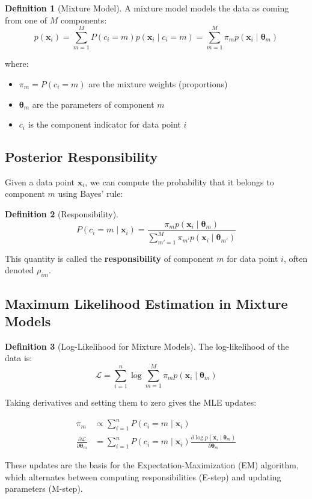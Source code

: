 \documentclass[12pt,a4paper]{article}
\theoremstyle{definition}
\newtheorem{definition}{Definition}[section]
\begin{document}
\begin{definition}[Mixture Model]
A mixture model models the data as coming from one of $M$ components:
\[
p(\mathbf{x}_i) = \sum_{m=1}^M P(c_i = m) p(\mathbf{x}_i \mid c_i = m) = \sum_{m=1}^M \pi_m p(\mathbf{x}_i \mid \boldsymbol{\theta}_m)
\]

where:
\begin{itemize}
    \item $\pi_m = P(c_i = m)$ are the mixture weights (proportions)
    \item $\boldsymbol{\theta}_m$ are the parameters of component $m$
    \item $c_i$ is the component indicator for data point $i$
\end{itemize}
\end{definition}

\subsection{Posterior Responsibility}

Given a data point $\mathbf{x}_i$, we can compute the probability that it belongs to component $m$ using Bayes' rule:

\begin{definition}[Responsibility]
\[
P(c_i = m \mid \mathbf{x}_i) = \frac{\pi_m p(\mathbf{x}_i \mid \boldsymbol{\theta}_m)}{\sum_{m'=1}^M \pi_{m'} p(\mathbf{x}_i \mid \boldsymbol{\theta}_{m'})}
\]

This quantity is called the \textbf{responsibility} of component $m$ for data point $i$, often denoted $\rho_{im}$.
\end{definition}

\subsection{Maximum Likelihood Estimation in Mixture Models}

\begin{definition}[Log-Likelihood for Mixture Models]
The log-likelihood of the data is:
\[
\mathcal{L} = \sum_{i=1}^n \log \sum_{m=1}^M \pi_m p(\mathbf{x}_i \mid \boldsymbol{\theta}_m)
\]

Taking derivatives and setting them to zero gives the MLE updates:

\begin{align}
\pi_m &\propto \sum_{i=1}^n P(c_i = m \mid \mathbf{x}_i) \\
\frac{\partial \mathcal{L}}{\partial \boldsymbol{\theta}_m} &= \sum_{i=1}^n P(c_i = m \mid \mathbf{x}_i) \frac{\partial \log p(\mathbf{x}_i \mid \boldsymbol{\theta}_m)}{\partial \boldsymbol{\theta}_m}
\end{align}

These updates are the basis for the Expectation-Maximization (EM) algorithm, which alternates between computing responsibilities (E-step) and updating parameters (M-step).
\end{definition}
\end{document}
